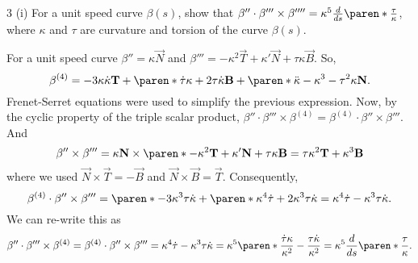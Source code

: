 \documentclass[11pt]{penrose}
\begin{document}
\begin{problem}{3 (i)}
    For a unit speed curve $\beta(s)$, show that $\beta'' \cdot \beta''' \times \beta'''' = \kappa^5 \frac{d}{ds}\paren*{\frac{\tau}{\kappa}}$, where $\kappa$ and $\tau$ are curvature and torsion of the curve $\beta(s)$.

    \solution For a unit speed curve $\beta'' = \kappa \vec{N}$ and $\beta''' = -\kappa^2 \vec{T} + \kappa' \vec{N} + \tau\kappa \vec{B}$. So,
    \begin{equation*}
        \beta^{(4)}
        = -3\kappa\dot{\kappa} \vec{T}
        + \paren*{\dot{\tau}\kappa + 2\tau\dot{\kappa}} \vec{B}
        + \paren*{\ddot{\kappa} - \kappa^3 - \tau^2 \kappa} \vec{N}.
    \end{equation*}
    Frenet-Serret equations were used to simplify the previous expression. Now, by the cyclic property of the triple scalar product, $\beta'' \cdot \beta''' \times \beta^{(4)} = \beta^{(4)} \cdot \beta'' \times \beta'''$. And
    \begin{equation*}
        \beta'' \times \beta'''
        = \kappa\vec{N} \times \paren*{-\kappa^2 \vec{T} + \kappa' \vec{N} + \tau\kappa \vec{B}}
        = \tau \kappa^2 \vec{T} + \kappa^3 \vec{B}
    \end{equation*}
    where we used $\vec{N} \times \vec{T} = - \vec{B}$ and $\vec{N} \times \vec{B} = \vec{T}$. Consequently,
    \begin{equation*}
        \beta^{(4)} \cdot \beta'' \times \beta'''
        = \paren*{-3 \kappa^3 \tau \dot{\kappa}} + \paren*{\kappa^4 \dot{\tau} + 2 \kappa^3 \tau \dot{\kappa}}
        = \kappa^4 \dot{\tau} - \kappa^3 \tau \dot{\kappa}.
    \end{equation*}
    We can re-write this as
    \begin{equation*}
        \beta'' \cdot \beta''' \times \beta^{(4)}
        = \beta^{(4)} \cdot \beta'' \times \beta'''
        = \kappa^4 \dot{\tau} - \kappa^3 \tau \dot{\kappa}
        = \kappa^5 \paren*{ \frac{\dot{\tau} \kappa}{\kappa^2} - \frac{\tau \dot{\kappa}}{\kappa^2} }
        = \kappa^5 \frac{d}{ds}\paren*{\frac{\tau}{\kappa}}.
    \end{equation*}
\end{problem}
\end{document}

